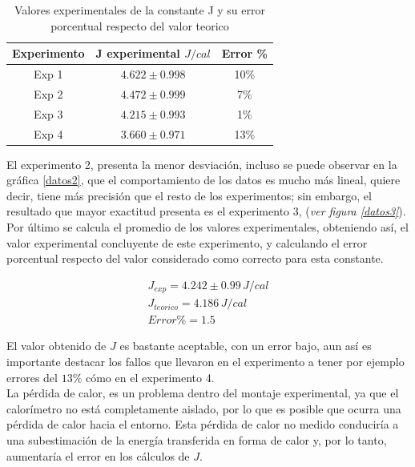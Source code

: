 \documentclass[10pt]{article}
\begin{document}
\begin{multicols*}{2}
\begin{table}[H]
\centering
\caption{Valores experimentales de la constante J y su error porcentual respecto del valor teorico}
\begin{tabular}{c|c|c}
\hline
\hline
\textbf{Experimento} & \textbf{J experimental $J/cal$} & \textbf{Error \%} \\
\hline
\hline
Exp 1 & $4.622 \pm 0.998$ & 10\% \\
\hline
Exp 2 & $4.472 \pm 0.999$ & 7\% \\
\hline
Exp 3 & $4.215 \pm 0.993$ & 1\% \\
\hline
Exp 4 & $3.660 \pm 0.971$ & 13\% \\
\hline
\end{tabular}
\end{table}

El experimento 2, presenta la menor desviación, incluso se puede observar en la gráfica \ref{datos2}, que el comportamiento de los datos es mucho más lineal, quiere decir, tiene más precisión que el resto de los experimentos; sin embargo, el resultado que mayor exactitud presenta es el experimento 3, (\textit{ver figura \ref{datos3}}).  \\

Por último se calcula el promedio de los valores experimentales, obteniendo así, el valor experimental concluyente de este experimento, y calculando el error porcentual respecto del valor considerado como correcto para esta constante.

\begin{equation}
 \begin{split}
    J_{exp} = 4.242 \pm 0.99 \,  J/cal\\
    J_{teorico} = 4.186 \, J/cal\\
    Error\% = 1.5
 \end{split}
\end{equation}

El valor obtenido de $J$ es bastante aceptable, con un error bajo, aun así es importante destacar los fallos que llevaron en el experimento a tener por ejemplo errores del $13\%$ cómo en el experimento 4.\\

La pérdida de calor, es un problema dentro del montaje experimental, ya que el calorímetro no está completamente aislado, por lo que es posible que ocurra una pérdida de calor hacia el entorno. Esta pérdida de calor no medido conduciría a una subestimación de la energía transferida en forma de calor y, por lo tanto, aumentaría el error en los cálculos de $J$.\\



\end{multicols*}
\end{document}
